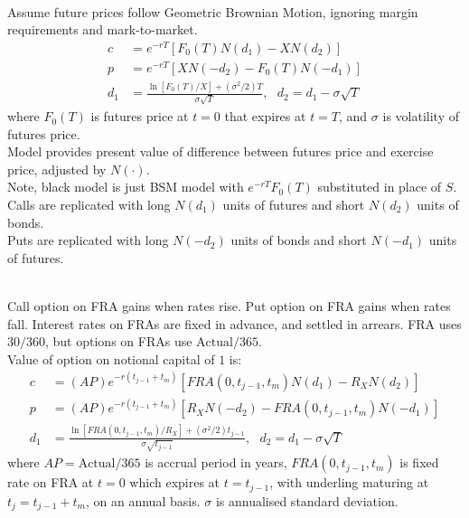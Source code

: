 \begin{remark} \\
Assume future prices follow Geometric Brownian Motion, ignoring margin requirements and mark-to-market.
\begin{align}
c &= e^{-rT}[F_0(T)N(d_1) - XN(d_2)] \nonumber \\
p &= e^{-rT}[XN(-d_2) - F_0(T)N(-d_1)] \nonumber \\
d_1 &= \frac{\ln[F_0(T)/X] + (\sigma^2/2)T}{\sigma \sqrt{T}}, \ \ \ d_2 = d_1 - \sigma\sqrt{T} \nonumber
\end{align}
where $F_0(T)$ is futures price at $t=0$ that expires at $t=T$, and $\sigma$ is volatility of futures price.\\
Model provides present value of difference between futures price and exercise price, adjusted by $N(\cdot)$.\\
Note, black model is just BSM model with $e^{-rT}F_0(T)$ substituted in place of $S$.\\
Calls are replicated with long $N(d_1)$ units of futures and short $N(d_2)$ units of bonds.\\
Puts are replicated with long $N(-d_2)$ units of bonds and short $N(-d_1)$ units of futures.
\end{remark}

\begin{remark} \\
Call option on FRA gains when rates rise. Put option on FRA gains when rates fall. Interest rates on FRAs are fixed in advance, and settled in arrears. FRA uses $30/360$, but options on FRAs use $\text{Actual}/365$.\\
Value of option on notional capital of $1$ is:
\begin{align}
c &= (AP)e^{-r(t_{j-1} + t_m)}[FRA(0, t_{j-1}, t_m)N(d_1) - R_{X}N(d_2)] \nonumber \\
p &= (AP)e^{-r(t_{j-1} + t_m)}[R_{X}N(-d_2) - FRA(0, t_{j-1}, t_m)N(-d_1)] \nonumber \\
d_1 &= \frac{\ln[FRA(0, t_{j-1}, t_m)/R_X] + (\sigma^2/2)t_{j-1}}{\sigma \sqrt{t_{j-1}}}, \ \ \ d_2 = d_1 - \sigma\sqrt{T} \nonumber
\end{align}
where $AP=\text{Actual}/365$ is accrual period in years, $FRA(0, t_{j-1}, t_m)$ is fixed rate on FRA at $t=0$ which expires at $t = t_{j-1}$, with underling maturing at $t_j = t_{j-1} + t_m$, on an annual basis. $\sigma$ is annualised standard deviation.
\end{remark}

